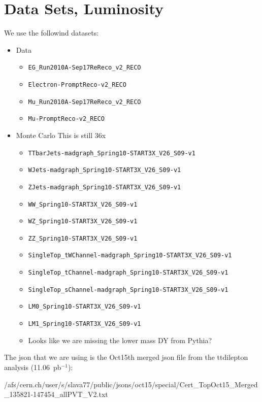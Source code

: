 \section{Data Sets, Luminosity}
\label{sec:datasets}

We use the followind datasets:

\begin{itemize}
\item Data 
\begin{itemize}
\item \verb=EG_Run2010A-Sep17ReReco_v2_RECO=
\item \verb=Electron-PromptReco-v2_RECO=
\item \verb=Mu_Run2010A-Sep17ReReco_v2_RECO=
\item \verb=Mu-PromptReco-v2_RECO=
\end{itemize}
\item Monte Carlo {\color{red} This is still 36x}
\begin{itemize}
\item \verb=TTbarJets-madgraph_Spring10-START3X_V26_S09-v1=
\item \verb=WJets-madgraph_Spring10-START3X_V26_S09-v1=
\item \verb=ZJets-madgraph_Spring10-START3X_V26_S09-v1=
\item \verb=WW_Spring10-START3X_V26_S09-v1=
\item \verb=WZ_Spring10-START3X_V26_S09-v1=
\item \verb=ZZ_Spring10-START3X_V26_S09-v1=
\item \verb=SingleTop_tWChannel-madgraph_Spring10-START3X_V26_S09-v1=
\item \verb=SingleTop_tChannel-madgraph_Spring10-START3X_V26_S09-v1=
\item \verb=SingleTop_sChannel-madgraph_Spring10-START3X_V26_S09-v1=
\item \verb=LM0_Spring10-START3X_V26_S09-v1=
\item \verb=LM1_Spring10-START3X_V26_S09-v1=
\item {\color{red} Looks like we are missing the lower mass
DY from Pythia?}
\end{itemize}
\end{itemize}

The json that we are using is the Oct15th merged json file from the ttdilepton analysis (11.06~pb$^{-1}$):

/afs/cern.ch/user/s/slava77/public/jsons/oct15/special/Cert\_TopOct15\_Merged\_135821-147454\_allPVT\_V2.txt

